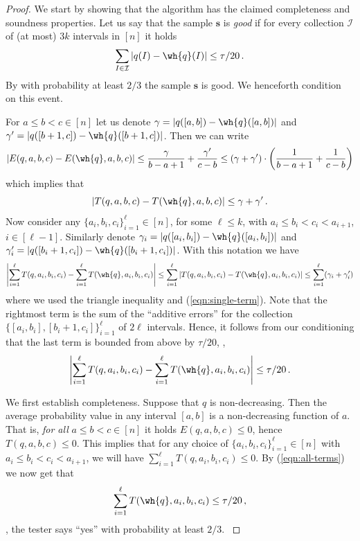\begin{proof}
We start by showing that the algorithm has the claimed completeness and soundness
properties.
Let us say that the sample $\mathbf{s}$ is \emph{good} if 
for every collection $\mathcal{I}$ of (at most) $3k$ intervals in $[n]$ it holds 
$$\sum_{I \in \mathcal{I}} |q(I) - \wh{q}(I) | \le \tau/20\,.$$ By 
with probability at least $2/3$ the sample $\mathbf{s}$ is good.
We henceforth condition on this event.
  

For $a \leq b  < c \in [n]$ let us denote $\gamma = \left| q([a,b]) - \wh{q}([a,b])\right|$ and $\gamma' = \left| q([b+1,c]) - \wh{q}([b+1,c])\right|$. 
Then we can write
$$
|E(q, a,b,c) - E(\wh{q}, a,b,c)| \le \frac{\gamma}{b-a+1} +  \frac{\gamma'}{c-b} \le (\gamma+\gamma') \cdot \left( \frac{1}{b-a+1} +  \frac{1}{c-b} \right)
$$
which implies that
\begin{equation} \label{eqn:single-term}
|T(q, a,b,c) - T(\wh{q}, a,b,c)| \le \gamma + \gamma'\,.
\end{equation}
Now consider any $\{a_i, b_i, c_i\}_{i=1}^{\ell} \in  [n]$, for some $\ell \le k$, with $a_i \le b_i < c_i < a_{i+1}$, $i \in [\ell-1]$. 
Similarly denote $\gamma_i = \left| q([a_i,b_i]) - \wh{q}([a_i,b_i])\right|$ and $\gamma'_i = \left| q([b_i+1,c_i]) - \wh{q}([b_i+1,c_i])\right|$. 
With this notation we have
\[ 
\left|  \sum_{i=1}^{\ell} T(q, a_i, b_i, c_i)  -  \sum_{i=1}^{\ell} T(\wh{q}, a_i, b_i, c_i) \right| 
\le  \sum_{i=1}^{\ell} |T(q, a_i,b_i,c_i) - T(\wh{q}, a_i,b_i,c_i)| \le \sum_{i=1}^{\ell} (\gamma_i +\gamma'_i)
\]
where we used the triangle inequality and (\ref{eqn:single-term}). 
Note that the rightmost term is the sum of the ``additive errors'' for the collection $\{ [a_i, b_i], [b_i+1, c_i] \}_{i=1}^{\ell}$ of $2\ell$ intervals.
Hence, it follows from our conditioning that the last term is bounded from above by $\tau/20$, \ie, 
\begin{equation} \label{eqn:all-terms}
\left|  \sum_{i=1}^{\ell} T(q, a_i, b_i, c_i)  -  \sum_{i=1}^{\ell} T(\wh{q}, a_i, b_i, c_i) \right| 
\le \tau/20\,.
\end{equation}

We first establish completeness. Suppose that $q$ is non-decreasing. Then the average probability
value in any interval $[a,b]$ is a non-decreasing function of $a$.
That is, \emph{for all} $a \leq b < c \in [n]$ it holds
$E(q, a,b,c) \leq 0$, {hence $T(q,a,b,c) \leq 0$. This implies that for any choice of $\{a_i, b_i, c_i\}_{i=1}^{\ell} \in  [n]$ with $a_i \le b_i < c_i < a_{i+1}$, we will have 
$\sum_{i=1}^{\ell} T(q, a_i, b_i, c_i) \le 0$. By (\ref{eqn:all-terms}) we now get that $$\sum_{i=1}^{\ell} T(\wh{q}, a_i, b_i, c_i) \le \tau/20\,,$$ \ie, the tester 
says ``yes'' with probability at least $2/3$.
} 


\end{proof}
